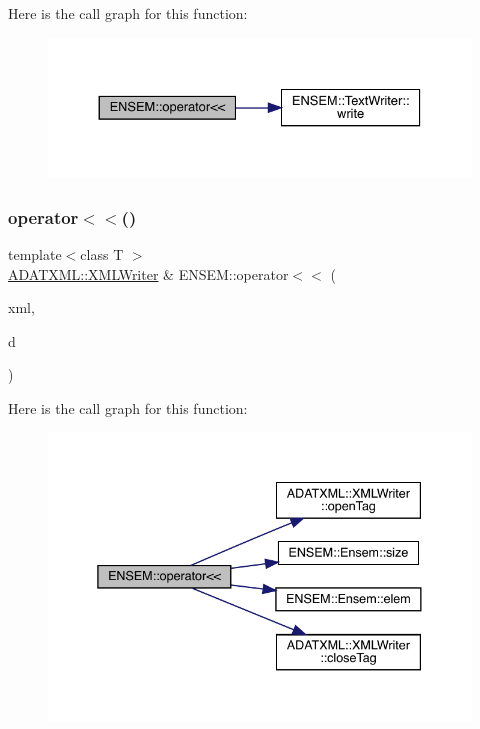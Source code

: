 Here is the call graph for this function\+:\nopagebreak
\begin{figure}[H]
\begin{center}
\leavevmode
\includegraphics[width=330pt]{d2/d94/namespaceENSEM_a970df8d2e87b8fc9353c4bb5df94b5c6_cgraph}
\end{center}
\end{figure}
\mbox{\label{namespaceENSEM_a88d3bf4c2ceeffc73f878f8236fc624e}} 
\subsubsection{\texorpdfstring{operator$<$$<$()}{operator<<()}\hspace{0.1cm}{\footnotesize\ttfamily [2/8]}}
{\footnotesize\ttfamily template$<$class T $>$ \\
\mbox{\hyperlink{classADATXML_1_1XMLWriter}{A\+D\+A\+T\+X\+M\+L\+::\+X\+M\+L\+Writer}} \& E\+N\+S\+E\+M\+::operator$<$$<$ (\begin{DoxyParamCaption}\item[{\mbox{\hyperlink{classADATXML_1_1XMLWriter}{A\+D\+A\+T\+X\+M\+L\+::\+X\+M\+L\+Writer}} \&}]{xml,  }\item[{const \mbox{\hyperlink{classENSEM_1_1Ensem}{Ensem}}$<$ T $>$ \&}]{d }\end{DoxyParamCaption})}

Here is the call graph for this function\+:\nopagebreak
\begin{figure}[H]
\begin{center}
\leavevmode
\includegraphics[width=338pt]{d2/d94/namespaceENSEM_a88d3bf4c2ceeffc73f878f8236fc624e_cgraph}
\end{center}
\end{figure}
\mbox{\label{namespaceENSEM_afd853d981d87472175af5dac828d6bbb}} 
